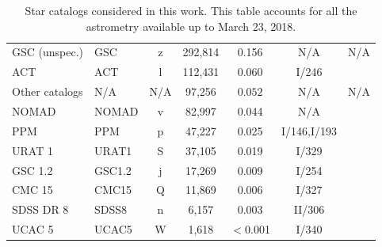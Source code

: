 \documentclass[review]{elsarticle}
\begin{document}
\begin{table}
\begin{center}
\begin{tabular}{llccccc}
GSC (unspec.)& GSC & z & 292,814 & 0.156    & N/A          &N/A\\
ACT         & ACT  & l & 112,431 & 0.060 & I/246             &\citet{act}\\
Other catalogs & N/A &N/A& 97,256 & $0.052$ & N/A & N/A\\
NOMAD       & NOMAD  & v  & 82,997 & 0.044 & N/A           &\citet{nomad}\\
PPM         & PPM  & p & 47,227 & 0.025 & I/146,I/193              &\citet{ppm}\\
URAT 1      & URAT1  & S & 37,105 & 0.019 & I/329            &\citet{urat1}\\
GSC 1.2     & GSC1.2& j  & 17,269 & 0.009 & I/254            &\citet{gsc1.2}\\
CMC 15      & CMC15& Q  & 11,869 & 0.006 &  I/327            &\citet{cmc15}\\
SDSS DR 8    & SDSS8  & n &  6,157 & 0.003 & II/306            &\citet{sdss8}\\
UCAC 5   & UCAC5 & W & 1,618 & $<$0.001 & I/340 & \citet{ucac5} \\

\hline
\end{tabular}
\end{center}
\caption{Star catalogs considered in this work. This table accounts for all the astrometry
  available up to March 23, 2018.}
\label{tab:catalogs}
\end{table}
\end{document}
